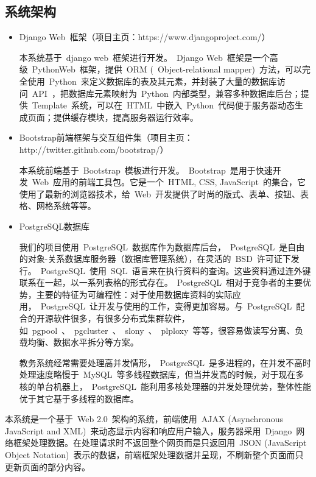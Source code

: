 \subsection{系统架构}
\begin{itemize}
  \item Django Web~框架（项目主页：https://www.djangoproject.com/）
  
  \CJKindent 本系统基于~django web~框架进行开发。~Django Web~框架是一个高级~Python\footnotemark[1] Web~框架，提供~ORM (~Object-relational mapper)~方法，可以完全使用~Python~来定义数据库的表及其元素，并封装了大量的数据库访问~API~，把数据库元素映射为~Python~内部类型，兼容多种数据库后台；提供~Template~系统，可以在~HTML~中嵌入~Python~代码便于服务器动态生成页面；提供缓存模块，提高服务器运行效率。
  
  \item Bootstrap前端框架与交互组件集（项目主页：http://twitter.github.com/bootstrap/）
  
  \CJKindent 本系统前端基于~Bootstrap~模板进行开发。~Bootstrap~是用于快速开发~Web~应用的前端工具包。它是一个~HTML, CSS, JavaScript~的集合，它使用了最新的浏览器技术，给~Web~开发提供了时尚的版式、表单、按钮、表格、网格系统等等。
  
  \item PostgreSQL数据库
  
  \CJKindent 我们的项目使用~PostgreSQL~数据库作为数据库后台，~PostgreSQL~是自由的对象-关系数据库服务器（数据库管理系统），在灵活的~BSD~许可证下发行。~PostgreSQL~使用~SQL~语言来在执行资料的查询。这些资料通过连外键联系在一起，以一系列表格的形式存在。~PostgreSQL~相对于竞争者的主要优势，主要的特征为可编程性：对于使用数据库资料的实际应用，~PostgreSQL~让开发与使用的工作，变得更加容易。与~PostgreSQL~配合的开源软件很多，有很多分布式集群软件，如~pgpool~、~pgcluster~、~slony~、~plploxy~等等，很容易做读写分离、负载均衡、数据水平拆分等方案。
  
  \CJKindent 教务系统经常需要处理高并发情形，~PostgreSQL~是多进程的，在并发不高时处理速度略慢于~MySQL~等多线程数据库，但当并发高的时候，对于现在多核的单台机器上，~PostgreSQL~能利用多核处理器的并发处理优势，整体性能优于其它基于多线程的数据库。
\end{itemize}

本系统是一个基于~Web 2.0~架构的系统，前端使用~AJAX (Asynchronous JavaScript and XML)~来动态显示内容和响应用户输入，服务器采用~Django~网络框架处理数据。在处理请求时不返回整个网页而是只返回用~JSON (JavaScript Object Notation)~表示的数据，前端框架处理数据并呈现，不刷新整个页面而只更新页面的部分内容。

